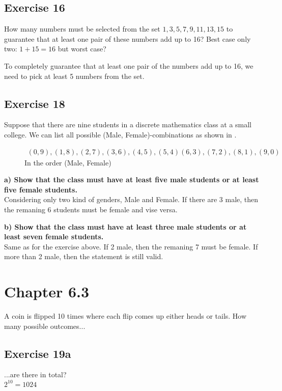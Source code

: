 \documentclass[12pt]{article}
\begin{document}
    \subsection{Exercise 16}
    How many numbers must be selected from the set ${1, 3, 5, 7, 9, 11, 13, 15}$ to guarantee that at least one pair of these numbers add up to 16?
    Best case only two: $1+15=16$ but worst case?

    To completely guarantee that at least one pair of the numbers add up to 16, we need to pick at least 5 numbers from the set.

    \subsection{Exercise 18}
    Suppose that there are nine students in a discrete mathematics class at a small college. We can list all possible (Male, Female)-combinations as shown in .
   \begin{figure}[h]
    \label{fig:groupings}
    \begin{equation}
      \begin{split}
        (0,9),(1,8),(2,7),(3,6),(4,5),(5,4)(6,3),(7,2),(8,1),(9,0)
      \end{split}
    \end{equation}
    \centering
    In the order (Male, Female)
  \end{figure}
   
    \textbf{a) Show that the class must have at least five male students or at least five female students.}\\
    Considering only two kind of genders, Male and Female. If there are 3 male, then the remaning 6 students must be female and vise versa.

    \textbf{b) Show that the class must have at least three male students or at least seven female students.}\\
    Same as for the exercise above. If 2 male, then the remaning 7 must be female. If more than 2 male, then the statement is still valid.
    
    \section{Chapter 6.3}
    A coin is flipped 10 times where each flip comes up either heads or tails. How many possible outcomes...

    \subsection{Exercise 19a}
    ...are there in total?\\
    $2^{10}=1024$
\end{document}
